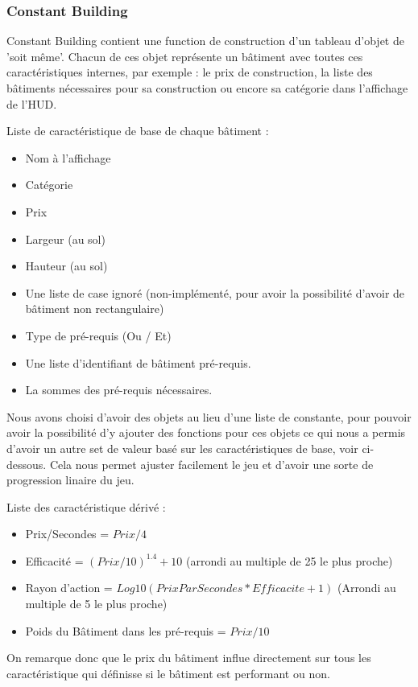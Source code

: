 \documentclass[a4paper,10pt,openany,oneside]{report}
\begin{document}
\subsubsection{Constant Building}
Constant Building contient une function de construction d'un tableau d'objet de 'soit même'. Chacun de ces objet représente un bâtiment avec toutes ces caractéristiques internes, par exemple : le prix de construction, la liste des bâtiments nécessaires pour sa construction ou encore sa catégorie dans l'affichage de l'HUD.

Liste de caractéristique de base de chaque bâtiment :
\begin{itemize}
	\item Nom à l'affichage
	\item Catégorie
	\item Prix
	\item Largeur (au sol)
	\item Hauteur (au sol)
	\item Une liste de case ignoré (non-implémenté, pour avoir la possibilité d'avoir de bâtiment non rectangulaire)
	\item Type de pré-requis (Ou / Et)
	\item Une liste d'identifiant de bâtiment pré-requis.
	\item La sommes des pré-requis nécessaires. 
\end{itemize}

Nous avons choisi d'avoir des objets au lieu d'une liste de constante, pour pouvoir avoir la possibilité d'y ajouter des fonctions pour ces objets ce qui nous a permis d'avoir un autre set de valeur basé sur les caractéristiques de base, voir ci-dessous. Cela nous permet ajuster facilement le jeu et d'avoir une sorte de progression linaire du jeu.

Liste des caractéristique dérivé :
\begin{itemize}
  \item Prix/Secondes = \(Prix / 4\)
  \item Efficacité = \((Prix/10)^{1.4} + 10\) (arrondi au multiple de 25 le plus proche)
  \item Rayon d'action = \(Log10(PrixParSecondes*Efficacite + 1)\) (Arrondi au multiple de 5 le plus proche)
  \item Poids du Bâtiment dans les pré-requis = \(Prix / 10\)
\end{itemize}

On remarque donc que le prix du bâtiment influe directement sur tous les caractéristique qui définisse si le bâtiment est performant ou non.
\end{document}
